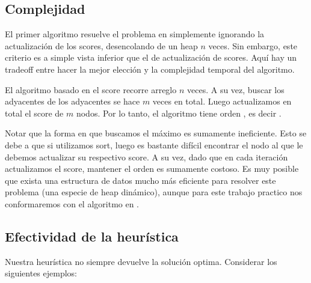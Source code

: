 \subsection{Complejidad}

El primer algoritmo resuelve el problema en  simplemente ignorando la actualización de los scores, desencolando de un heap $n$ veces. Sin embargo, este criterio es a simple vista inferior que el de actualización de scores. Aquí hay un tradeoff entre hacer la mejor elección y la complejidad temporal del algoritmo.

El algoritmo basado en el score recorre arreglo $n$ veces. A su vez, buscar los adyacentes de los adyacentes se hace $m$ veces en total. Luego actualizamos en total el score de $m$ nodos. Por lo tanto, el algoritmo tiene orden , es decir .

Notar que la forma en que buscamos el máximo es sumamente ineficiente. Esto se debe a que si utilizamos sort, luego es bastante difícil encontrar el nodo al que le debemos actualizar su respectivo score. A su vez, dado que en cada iteración actualizamos el score, mantener el orden es sumamente costoso. Es muy posible que exista una estructura de datos mucho más eficiente para resolver este problema (una especie de heap dinámico), aunque para este trabajo practico nos conformaremos con el algoritmo en .

\subsection{Efectividad de la heurística}

Nuestra heurística no siempre devuelve la solución optima. Considerar los siguientes ejemplos:

